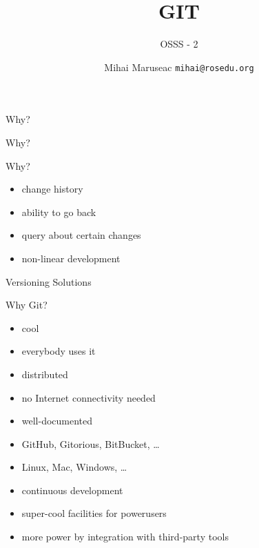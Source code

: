 \documentclass{beamer}
\title[]{GIT}
\subtitle{OSSS - 2}
\institute[]{ROSEdu}
\author[]{
  Mihai Maruseac \texttt{mihai@rosedu.org}
}
\begin{document}
\maketitle

\begin{frame}{Why?}
  \begin{center}
  \end{center}
\end{frame}

\begin{frame}{Why?}
  \begin{center}
  \end{center}
\end{frame}

\begin{frame}{Why?}
  \begin{itemize}
    \item change history
    \pause
    \item ability to go back
    \pause
    \item query about certain changes
    \pause
    \item non-linear development
  \end{itemize}
\end{frame}

\begin{frame}{Versioning Solutions}
  \begin{center}
  \end{center}
\end{frame}

\begin{frame}{Why Git?}
  \begin{itemize}
    \item cool
    \item everybody uses it
    \item distributed
    \item no Internet connectivity needed
    \item well-documented
    \item GitHub, Gitorious, BitBucket, \ldots
    \item Linux, Mac, Windows, \ldots
    \item continuous development
    \item super-cool facilities for powerusers
    \item more power by integration with third-party tools
  \end{itemize}
  \vspace{-6cm}
  \begin{center}
    \hspace{6cm}
  \end{center}
\end{frame}
\end{document}
